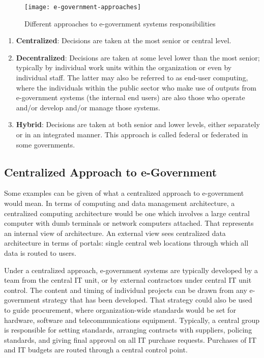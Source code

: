\begin{figure}[tph]
	\centering
	\texttt{[image: e-government-approaches]}
	\caption{Different approaches to e-government systems responsibilities}
	\label{fig:e-government-approaches}
\end{figure}
\begin{enumerate}
	\item \textbf{Centralized}: Decisions are taken at the most senior or central level.
	
	\item \textbf{Decentralized}: Decisions are taken at some level lower than the most senior; typically by individual work units within the organization or even by individual staff. The latter may also be referred to as end-user computing, where the individuals within the public sector who make use of outputs from e-government systems (the internal
	end users) are also those who operate and/or develop and/or manage those systems.
	
	\item \textbf{Hybrid}: Decisions are taken at both senior and lower levels, either separately or in an	integrated manner. This approach is called federal or federated in some governments.
\end{enumerate}

\subsection[Centralized Approach]{Centralized Approach to e-Government}
Some examples can be given of what a centralized approach to e-government would
mean. In terms of computing and data management architecture, a centralized computing architecture would be one which involves a large central computer with dumb terminals or network computers attached. That represents an internal view of architecture. An external view sees centralized data architecture in terms of portals: single central web locations through which all data is routed to users. 

Under a centralized approach, e-government systems are typically developed by a team from the central IT unit, or by external contractors under central IT unit control. The content and timing of individual projects can be drawn from any e-government strategy that has been developed. That strategy could also be used to guide procurement, where organization-wide
standards would be set for hardware, software and telecommunications equipment. Typically, a central group is responsible for setting standards, arranging contracts with suppliers, policing standards, and giving final approval on all IT purchase requests. Purchases of IT and IT budgets are routed through a central control point.

